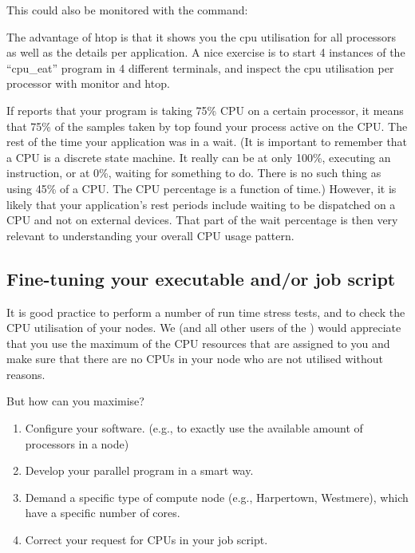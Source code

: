 This could also be monitored with the  command:

\begin{prompt}
\end{prompt}

\vbox{}


The advantage of htop is that it shows you the cpu utilisation for all
processors as well as the details per application.  A nice exercise is to start
4 instances of the ``cpu\_eat'' program in 4 different terminals, and inspect
the cpu utilisation per processor with monitor and htop.

If  reports that your program is taking 75\% CPU on a
certain processor, it means that 75\% of the samples taken by top found your
process active on the CPU. The rest of the time your application was in a wait.
(It is important to remember that a CPU is a discrete state machine. It really
can be at only 100\%, executing an instruction, or at 0\%, waiting for
something to do. There is no such thing as using 45\% of a CPU. The CPU
percentage is a function of time.) However, it is likely that your
application's rest periods include waiting to be dispatched on a CPU and not on
external devices. That part of the wait percentage is then very relevant to
understanding your overall CPU usage pattern.

\subsection{Fine-tuning your executable and/or job script}

It is good practice to perform a number of run time stress tests, and to check
the CPU utilisation of your nodes. We (and all other users of the \hpc) would
appreciate that you use the maximum of the CPU resources that are assigned to
you and make sure that there are no CPUs in your node who are not utilised
without reasons.

But how can you maximise?

\begin{enumerate}
\item  Configure your software. (e.g., to exactly use the available amount of processors in a node)
\item  Develop your parallel program in a smart way.
\item  Demand a specific type of compute node (e.g., Harpertown, Westmere), which have a specific number of cores.
\item  Correct your request for CPUs in your job script.
\end{enumerate}

